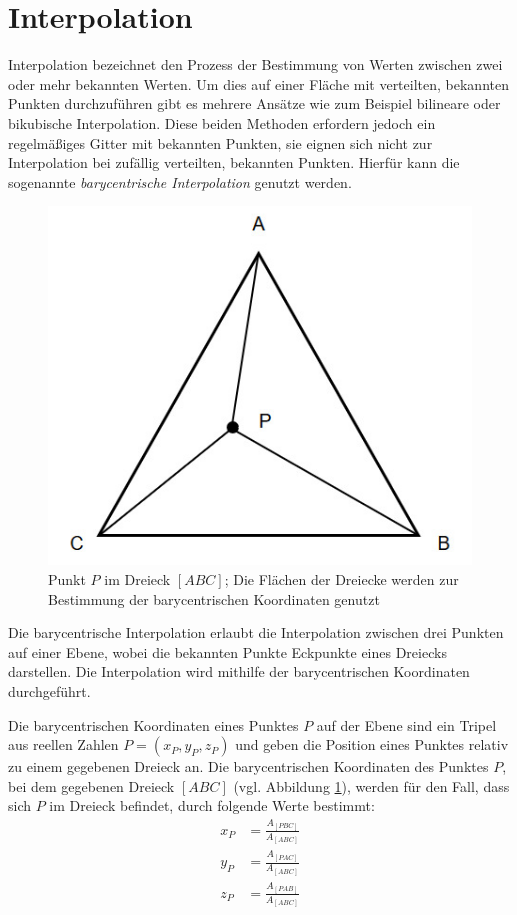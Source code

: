 \documentclass[10pt]{scrartcl}
\begin{document}
\newpage

\section{Interpolation}
\label{Interpolation}
Interpolation bezeichnet den Prozess der Bestimmung von Werten zwischen zwei oder mehr bekannten Werten. Um dies auf einer Fläche mit verteilten, bekannten Punkten durchzuführen gibt es mehrere Ansätze wie zum Beispiel bilineare oder bikubische Interpolation. Diese beiden Methoden erfordern jedoch ein regelmäßiges Gitter mit bekannten Punkten, sie eignen sich nicht zur Interpolation bei zufällig verteilten, bekannten Punkten. Hierfür kann die sogenannte \textit{barycentrische Interpolation} genutzt werden.

\begin{figure}
\centering
\includegraphics[scale=0.5]{images/barycentric_coordinates.jpg}
\caption{\label{img:barycentric_coordinates}Punkt $P$ im Dreieck $[ABC]$; Die Flächen der Dreiecke werden zur Bestimmung der barycentrischen Koordinaten genutzt}
\end{figure}

Die barycentrische Interpolation erlaubt die Interpolation zwischen drei Punkten auf einer Ebene, wobei die bekannten Punkte Eckpunkte eines Dreiecks darstellen. Die Interpolation wird mithilfe der barycentrischen Koordinaten durchgeführt. 

Die barycentrischen Koordinaten eines Punktes $P$ auf der Ebene sind ein Tripel aus reellen Zahlen $P = (x_P, y_P, z_P)$ \cite[vgl.][S. 6]{barycoords} und geben die Position eines Punktes relativ zu einem gegebenen Dreieck an. Die barycentrischen Koordinaten des Punktes $P$, bei dem gegebenen Dreieck $[ABC]$ (vgl. Abbildung \ref{img:barycentric_coordinates}), werden für den Fall, dass sich $P$ im Dreieck befindet, durch folgende Werte bestimmt:
\begin{align*}
x_P &= \frac{A_{[PBC]}}{A_{[ABC]}}\\
y_P &= \frac{A_{[PAC]}}{A_{[ABC]}}\\
z_P &= \frac{A_{[PAB]}}{A_{[ABC]}}
\end{align*}
\end{document}
